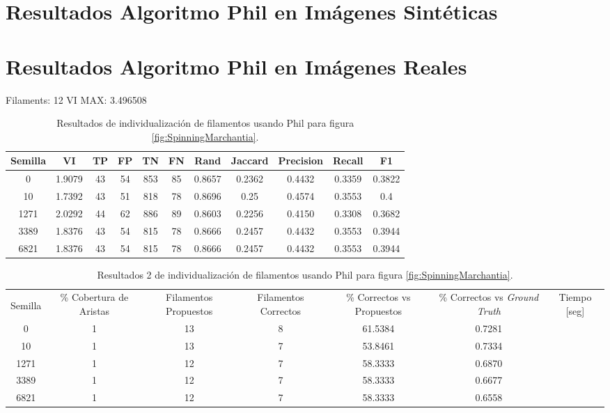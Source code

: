 \label{chap:apendice}

\section{Resultados Algoritmo Phil en Im\'agenes Sint\'eticas}

\section{Resultados Algoritmo Phil en Im\'agenes Reales}

Filaments: 12	VI MAX: 3.496508
\begin{table}[h]
    \centering
    \begin{tabular}{|c|c|c|c|c|c|c|c|c|c|c|}
    \hline
        Semilla & VI & TP & FP &TN &FN & Rand	& Jaccard &	Precision &	Recall &	F1 \\ \hline 
        0    & 1.9079 & 43 & 54 & 853 & 85 & 0.8657 & 0.2362 & 0.4432 & 0.3359 & 0.3822 \\
        10   & 1.7392 & 43 & 51 & 818 & 78 & 0.8696 & 0.25 & 0.4574 & 0.3553 & 0.4 \\
        1271 & 2.0292 & 44 & 62 & 886 & 89 & 0.8603 & 0.2256 & 0.4150 & 0.3308 & 0.3682 \\
        3389 & 1.8376 & 43 & 54 & 815 & 78 & 0.8666 & 0.2457 & 0.4432 & 0.3553 & 0.3944 \\
        6821 & 1.8376 & 43 & 54 & 815 & 78 & 0.8666 & 0.2457 & 0.4432 & 0.3553 & 0.3944 \\
        \hline
    \end{tabular}
    \caption{Resultados de individualizaci\'on de filamentos usando Phil para figura \ref{fig:SpinningMarchantia}.}
    \label{tab:SpinningMarchantiaResults1}
\end{table}

\begin{table}[h]
    \centering
    \begin{tabular}{|c|c|c|c|c|c|c|}
    \hline
         & \multirow{4}{2cm}{\centering \% Cobertura de Aristas} & \multirow{4}{2cm}{Filamentos Propuestos} & \multirow{4}{2cm}{Filamentos Correctos} & \multirow{4}{2.5cm}{\% Correctos vs Propuestos} & \multirow{4}{2.5cm}{\centering \% Correctos vs {\it Ground Truth}} & \multirow{4}{1.2cm}{\centering Tiempo [seg]} \\
         &  &  &  & & &  \\
        Semilla &  &  &  & & &  \\
        &  &  &  & & &  \\ \hline 
        0 & 1 & 13 & 8 & 61.5384 & 0.7281  \\
        10 & 1 & 13 & 7 & 53.8461 & 0.7334\\
        1271 & 1 & 12 & 7 & 58.3333 & 0.6870\\
        3389 & 1 & 12 & 7 & 58.3333 & 0.6677\\
        6821 & 1 & 12 & 7 & 58.3333 & 0.6558\\
        \hline
    \end{tabular}
    \caption{Resultados 2 de individualizaci\'on de filamentos usando Phil para figura \ref{fig:SpinningMarchantia}.}
    \label{tab:SpinningMarchantiaResults2}
\end{table}


